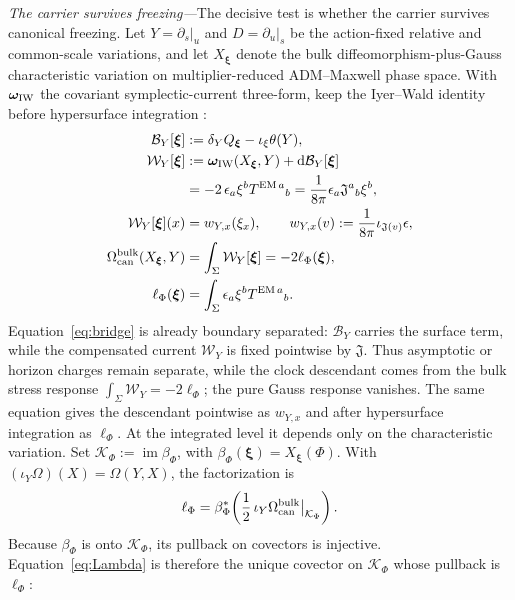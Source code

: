\documentclass[aps,prl,reprint]{revtex4-2}
\newcommand{\EM}{\mathrm{EM}}
\newcommand{\dd}{\mathrm d}
\newcommand{\cK}{\mathcal K}
\begin{document}
\textit{The carrier survives freezing---}The decisive test is whether the carrier survives canonical freezing. Let $Y=\partial_s|_u$ and $D=\partial_u|_s$ be the action-fixed relative and common-scale variations, and let $X_{\boldsymbol\xi}$ denote the bulk diffeomorphism-plus-Gauss characteristic variation on multiplier-reduced ADM--Maxwell phase space. With $\boldsymbol\omega_{\rm IW}$ the covariant symplectic-current three-form, keep the Iyer--Wald identity before hypersurface integration \cite{IyerWald}:
\begin{equation}
\begin{aligned}
\mathcal B_Y[\boldsymbol\xi]
&:=\delta_YQ_{\boldsymbol\xi}
-\iota_\xi\theta(Y),\\
\mathcal W_Y[\boldsymbol\xi]
&:=\boldsymbol\omega_{\rm IW}
(X_{\boldsymbol\xi},Y)
+\dd\mathcal B_Y[\boldsymbol\xi]\\
&=-2\,\epsilon_a\xi^bT^{\EM\,a}{}_b
=\frac{1}{8\pi}\epsilon_a
\mathfrak J^a{}_b\xi^b,\\
\mathcal W_Y[\boldsymbol\xi](x)
&=w_{Y,x}(\xi_x),\qquad
w_{Y,x}(v):=
\frac{1}{8\pi}\iota_{\mathfrak J(v)}\epsilon,\\
\Omega_{\rm can}^{\rm bulk}
(X_{\boldsymbol\xi},Y)
&=\int_\Sigma\mathcal W_Y[\boldsymbol\xi]
=-2\ell_\Phi(\boldsymbol\xi),\\
\ell_\Phi(\boldsymbol\xi)
&=\int_\Sigma
\epsilon_a\xi^bT^{\EM\,a}{}_b .
\end{aligned}
\label{eq:bridge}
\end{equation}
Equation~\eqref{eq:bridge} is already boundary separated: $\mathcal B_Y$ carries the surface term, while the compensated current $\mathcal W_Y$ is fixed pointwise by $\mathfrak J$. Thus asymptotic or horizon charges remain separate, while the clock descendant comes from the bulk stress response $\int_\Sigma\mathcal W_Y=-2\ell_\Phi$; the pure Gauss response vanishes. The same equation gives the descendant pointwise as $w_{Y,x}$ and after hypersurface integration as $\ell_\Phi$. At the integrated level it depends only on the characteristic variation. Set $\cK_\Phi:=\operatorname{im}\beta_\Phi$, with $\beta_\Phi(\boldsymbol\xi)=X_{\boldsymbol\xi}(\Phi)$. With $(\iota_Y\Omega)(X)=\Omega(Y,X)$, the factorization is
\begin{equation}
\ell_\Phi
=\beta_\Phi^*\!\left(\frac12\,\iota_Y\Omega_{\rm can}^{\rm bulk}\big|_{\cK_\Phi}\right).
\label{eq:Lambdafactor}
\end{equation}
Because $\beta_\Phi$ is onto $\cK_\Phi$, its pullback on covectors is injective. Equation~\eqref{eq:Lambda} is therefore the unique covector on $\cK_\Phi$ whose pullback is $\ell_\Phi$:
\end{document}

